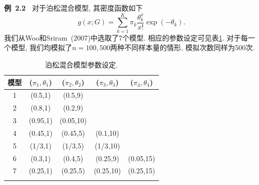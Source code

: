 \documentclass[a4paper,12pt,openany,oneside,utf-8]{ctexbook}
\newcommand{\xiaosihao}{\fontsize{12pt}{\baselineskip}\selectfont}
\newcommand{\wuhao}{\fontsize{10.5pt}{\baselineskip}\selectfont}
\begin{document}
\textbf{\xiaosihao 例~2.2~}
对于泊松混合模型, 其密度函数如下
\begin{equation*}
  g(x; G)=\sum_{k=1}^{K} \pi_{k} \frac{\theta_k^x}{x!} \exp(-\theta_k).
\end{equation*}
我们从Woo和Sriram~(2007)中选取了7个模型. 相应的参数设定可见表\ref{tab:Parameter values for the Poisson mixture models}. 对于每一个模型, 我们均模拟了$n=100, 500$两种不同样本量的情形, 模拟次数同样为500次.

\begin{table}[hp!] %
\wuhao
\centering
{}   %
\caption{泊松混合模型参数设定.}
\label{tab:Parameter values for the Poisson mixture models}
\medskip
\begin{tabular}{c cccc}
\Xhline{1.0pt}
模型 & ($\pi_1,\theta_1$) & ($\pi_2,\theta_2$) & ($\pi_3,\theta_3$) & ($\pi_4,\theta_4$)\\
\hline
1  & (0.5,1) & (0.5,9)   &          &          \\
2  & (0.8,1) & (0.2,9)   &          &          \\
3  & (0.95,1)& (0.05,10) &          &          \\
4  & (0.45,1)& (0.45,5)  & (0.1,10) &          \\
5  & (1/3,1) & (1/3,5)   & (1/3,10) &          \\
6  & (0.3,1) & (0.4,5)   & (0.25,9) & (0.05,15)\\
7  & (0.25,1)& (0.25,5)  & (0.25,10)& (0.25,15)\\
\Xhline{1.0pt}
\end{tabular}
\end{table}
\end{document}
